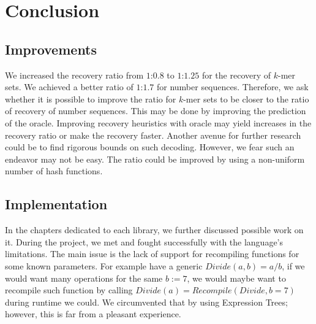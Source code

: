 \chapter*{Conclusion}

\section*{Improvements}
We increased the recovery ratio from $1$:$0.8$ to $1$:$1.25$ for the recovery of $k$-mer sets. We achieved a better ratio of $1$:$1.7$ for number sequences. Therefore, we ask whether it is possible to improve the ratio for $k$-mer sets to be closer to the ratio of recovery of number sequences. This may be done by improving the prediction of the oracle.
Improving recovery heuristics with oracle may yield increases in the recovery ratio or make the recovery faster.
Another avenue for further research could be to find rigorous bounds on such decoding. However, we fear such an endeavor may not be easy.
The ratio could be improved by using a non-uniform number of hash functions.



\section*{Implementation}
In the chapters dedicated to each library, we further discussed possible work on it. During the project, we met and fought successfully with the language's limitations. The main issue is the lack of support for recompiling functions for some known parameters. For example have a generic $Divide(a,b) = a / b$, if we would want many operations for the same $b:=7$, we would maybe want to recompile such function by calling $Divide(a) = Recompile(Divide, b = 7)$ during runtime we could. We circumvented that by using Expression Trees; however, this is far from a pleasant experience. 

